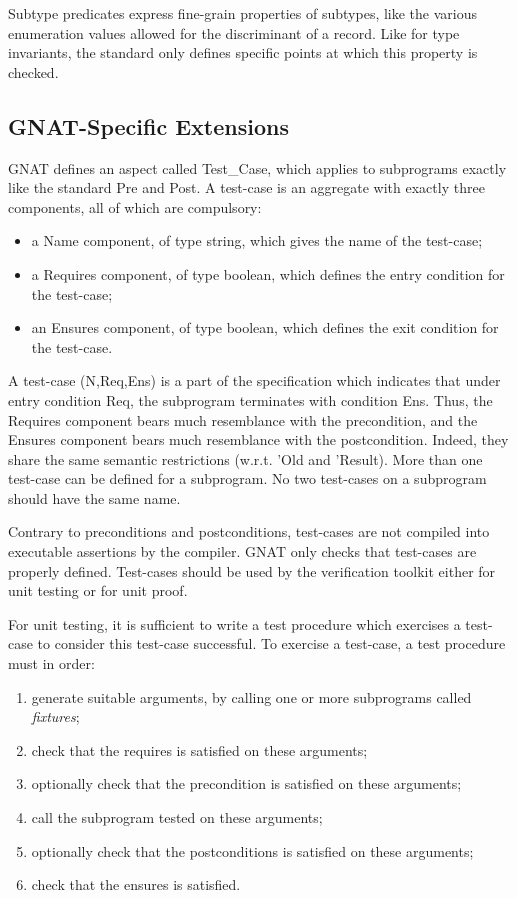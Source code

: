 \documentclass{article}
\begin{document}
Subtype predicates express fine-grain properties of subtypes, like the various
enumeration values allowed for the discriminant of a record. Like for type
invariants, the standard only defines specific points at which this property is
checked.

\subsection{GNAT-Specific Extensions}

GNAT defines an aspect called Test\_Case, which applies to subprograms exactly
like the standard Pre and Post. A test-case is an aggregate with exactly three
components, all of which are compulsory:
\begin{itemize}
\item a Name component, of type string, which gives the name of the test-case;
\item a Requires component, of type boolean, which defines the entry condition
  for the test-case;
\item an Ensures component, of type boolean, which defines the exit condition
  for the test-case.
\end{itemize}

A test-case (N,Req,Ens) is a part of the specification which indicates that
under entry condition Req, the subprogram terminates with condition Ens. Thus,
the Requires component bears much resemblance with the precondition, and the
Ensures component bears much resemblance with the postcondition. Indeed, they
share the same semantic restrictions (w.r.t. 'Old and 'Result).  More than one
test-case can be defined for a subprogram. No two test-cases on a subprogram
should have the same name.

Contrary to preconditions and postconditions, test-cases are not compiled into
executable assertions by the compiler. GNAT only checks that test-cases are
properly defined. Test-cases should be used by the verification toolkit either
for unit testing or for unit proof.

For unit testing, it is sufficient to write a test procedure which exercises a
test-case to consider this test-case successful. To exercise a test-case, a
test procedure must in order:
\begin{enumerate}
\item generate suitable arguments, by calling one or more subprograms
  called \textit{fixtures};
\item check that the requires is satisfied on these arguments;
\item optionally check that the precondition is satisfied on these arguments;
\item call the subprogram tested on these arguments;
\item optionally check that the postconditions is satisfied on these arguments;
\item check that the ensures is satisfied.
\end{enumerate}
\end{document}
